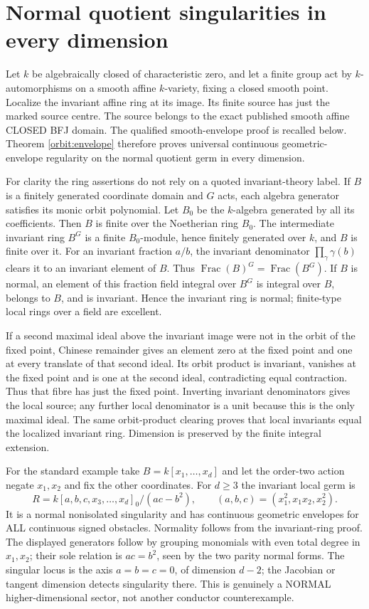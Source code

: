 \documentclass[11pt]{article}
\begin{document}
\section{Normal quotient singularities in every dimension}
Let $k$ be algebraically closed of characteristic zero, and let a finite
group act by $k$-automorphisms on a smooth affine $k$-variety, fixing a
closed smooth point. Localize the invariant affine ring at its image.
Its finite source has just the marked source centre. The source belongs
to the exact published smooth affine CLOSED BFJ domain. The qualified
smooth-envelope proof is recalled below. Theorem \ref{orbit:envelope}
therefore proves universal continuous geometric-envelope regularity on
the normal quotient germ in every dimension.

For clarity the ring assertions do not rely on a quoted invariant-theory
label. If $B$ is a finitely generated coordinate domain and $G$ acts,
each algebra generator satisfies its monic orbit polynomial.
Let $B_0$ be the $k$-algebra generated by all its coefficients.
Then $B$ is finite over the Noetherian ring $B_0$.
The intermediate invariant ring $B^G$ is a finite $B_0$-module, hence
finitely generated over $k$, and $B$ is finite over it.
For an invariant fraction $a/b$, the invariant denominator
$\prod_\gamma\gamma(b)$ clears it to an invariant element of $B$.
Thus $\operatorname{Frac}(B)^G=\operatorname{Frac}(B^G)$.
If $B$ is normal, an element of this fraction field integral over
$B^G$ is integral over $B$, belongs to $B$, and is invariant.
Hence the invariant ring is normal; finite-type local rings over a field
are excellent.

If a second maximal ideal above the invariant image were not in the
orbit of the fixed point, Chinese remainder gives an element zero at
the fixed point and one at every translate of that second ideal.
Its orbit product is invariant, vanishes at the fixed point and is one
at the second ideal, contradicting equal contraction. Thus that fibre
has just the fixed point. Inverting invariant denominators gives the
local source; any further local denominator is a unit because this is
the only maximal ideal. The same orbit-product clearing proves that
local invariants equal the localized invariant ring. Dimension is
preserved by the finite integral extension.

For the standard example take $B=k[x_1,\ldots,x_d]$ and let the
order-two action negate $x_1,x_2$ and fix the other coordinates.
For $d\ge3$ the invariant local germ is
\[
 R=k[a,b,c,x_3,\ldots,x_d]_0/(ac-b^2),\qquad
 (a,b,c)=(x_1^2,x_1x_2,x_2^2).
\]
It is a normal nonisolated singularity and has continuous geometric
envelopes for ALL continuous signed obstacles. Normality follows from
the invariant-ring proof. The displayed generators follow by grouping
monomials with even total degree in $x_1,x_2$; their sole relation is
$ac=b^2$, seen by the two parity normal forms. The singular locus is
the axis $a=b=c=0$, of dimension $d-2$; the Jacobian or tangent
dimension detects singularity there. This is genuinely a NORMAL
higher-dimensional sector, not another conductor counterexample.
\end{document}
